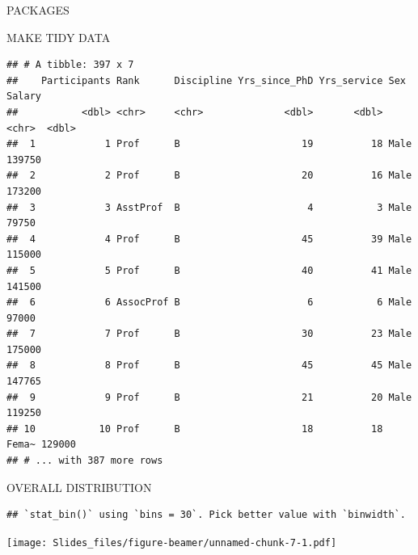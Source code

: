 \documentclass[ignorenonframetext,]{beamer}
\newenvironment{Shaded}{\begin{snugshade}}{\end{snugshade}}
\newcommand{\KeywordTok}[1]{\textcolor[rgb]{0.13,0.29,0.53}{\textbf{#1}}}
\newcommand{\DataTypeTok}[1]{\textcolor[rgb]{0.13,0.29,0.53}{#1}}
\newcommand{\FloatTok}[1]{\textcolor[rgb]{0.00,0.00,0.81}{#1}}
\newcommand{\StringTok}[1]{\textcolor[rgb]{0.31,0.60,0.02}{#1}}
\newcommand{\OperatorTok}[1]{\textcolor[rgb]{0.81,0.36,0.00}{\textbf{#1}}}
\newcommand{\NormalTok}[1]{#1}
\begin{document}
\begin{frame}[fragile]{PACKAGES}
\begin{block}{MAKE TIDY DATA}
\begin{verbatim}
## # A tibble: 397 x 7
##    Participants Rank      Discipline Yrs_since_PhD Yrs_service Sex   Salary
##           <dbl> <chr>     <chr>              <dbl>       <dbl> <chr>  <dbl>
##  1            1 Prof      B                     19          18 Male  139750
##  2            2 Prof      B                     20          16 Male  173200
##  3            3 AsstProf  B                      4           3 Male   79750
##  4            4 Prof      B                     45          39 Male  115000
##  5            5 Prof      B                     40          41 Male  141500
##  6            6 AssocProf B                      6           6 Male   97000
##  7            7 Prof      B                     30          23 Male  175000
##  8            8 Prof      B                     45          45 Male  147765
##  9            9 Prof      B                     21          20 Male  119250
## 10           10 Prof      B                     18          18 Fema~ 129000
## # ... with 387 more rows
\end{verbatim}

\end{block}

\begin{block}{OVERALL DISTRIBUTION}

\begin{Shaded}
\end{Shaded}

\begin{verbatim}
## `stat_bin()` using `bins = 30`. Pick better value with `binwidth`.
\end{verbatim}

\texttt{[image: Slides\_files/figure-beamer/unnamed-chunk-7-1.pdf]}

\end{block}


\end{frame}
\end{document}
